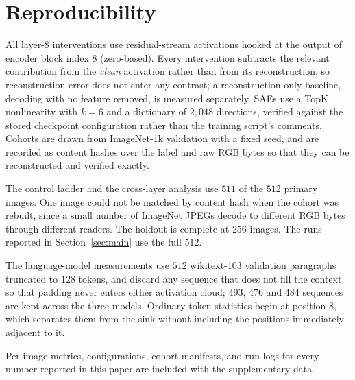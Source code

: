 \documentclass{article}
\begin{document}
\section{Reproducibility}
\label{app:repro}

All layer-8 interventions use residual-stream activations hooked at the output of encoder block index 8 (zero-based). Every intervention subtracts the relevant contribution from the \emph{clean} activation rather than from its reconstruction, so reconstruction error does not enter any contrast; a reconstruction-only baseline, decoding with no feature removed, is measured separately. SAEs use a TopK nonlinearity with $k=6$ and a dictionary of $2{,}048$ directions, verified against the stored checkpoint configuration rather than the training script's comments. Cohorts are drawn from ImageNet-1k validation with a fixed seed, and are recorded as content hashes over the label and raw RGB bytes so that they can be reconstructed and verified exactly.

The control ladder and the cross-layer analysis use $511$ of the $512$ primary images. One image could not be matched by content hash when the cohort was rebuilt, since a small number of ImageNet JPEGs decode to different RGB bytes through different readers. The holdout is complete at $256$ images. The runs reported in Section~\ref{sec:main} use the full $512$.

The language-model measurements use $512$ wikitext-103 validation paragraphs truncated to $128$ tokens, and discard any sequence that does not fill the context so that padding never enters either activation cloud; $493$, $476$ and $484$ sequences are kept across the three models. Ordinary-token statistics begin at position 8, which separates them from the sink without including the positions immediately adjacent to it.

Per-image metrics, configurations, cohort manifests, and run logs for every number reported in this paper are included with the supplementary data.
\end{document}
